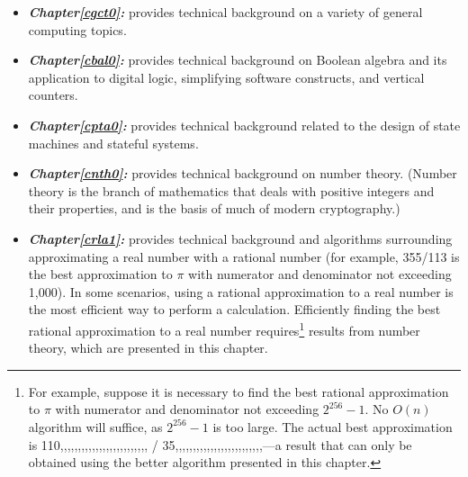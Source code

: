 \begin{itemize}
\item \emph{\textbf{Chapter\postchapterwordnonstretchable{}\ref{cgct0}: 
      \cgctzerolongtitlenoemph{}}} provides technical background on a variety of general 
      computing topics.
\item \emph{\textbf{Chapter\postchapterwordnonstretchable{}\ref{cbal0}: 
      \cbalzerolongtitlenoemph{}}} provides technical background on 
      Boolean algebra and its application to digital logic, simplifying software 
      constructs, and vertical counters.  
\item \emph{\textbf{Chapter\postchapterwordnonstretchable{}\ref{cpta0}: 
      \cptazerolongtitlenoemph{}}} provides technical background 
      related to the design of state machines and stateful systems.  
\item \emph{\textbf{Chapter\postchapterwordnonstretchable{}\ref{cnth0}: 
      \cnthzerolongtitlenoemph{}}} provides technical background on number theory.  (Number 
      theory is the branch of mathematics that deals with positive integers and 
      their properties, and is the basis of much of modern cryptography.) 
\item \emph{\textbf{Chapter\postchapterwordnonstretchable{}\ref{crla1}: 
      \crlaonelongtitlenoemph{}}} provides technical background and algorithms 
      surrounding approximating a real number with a rational number (for 
      example, 355/113 is the best approximation to $\pi$ with numerator and 
      denominator not exceeding 1,000).  In some scenarios, using a rational 
      approximation to a real number is the most efficient way to perform a 
      calculation.  Efficiently finding the best rational approximation to a 
      real number requires\footnote{For example, suppose it is necessary to find 
      the best rational approximation to $\pi$ with numerator and denominator 
      not exceeding $2^{256}-1$.  No $O(n)$ algorithm will suffice, as 
      $2^{256}-1$ is too large.  The actual best approximation is 
      110,,,,,,,,,,,,,,,,,,,,,,,,, / 35,,,,,,,,,,,,,,,,,,,,,,,,,---a result that can only be obtained using the better 
      algorithm presented in this chapter.} results from number theory, which 
      are presented in this chapter.  

\end{itemize}
